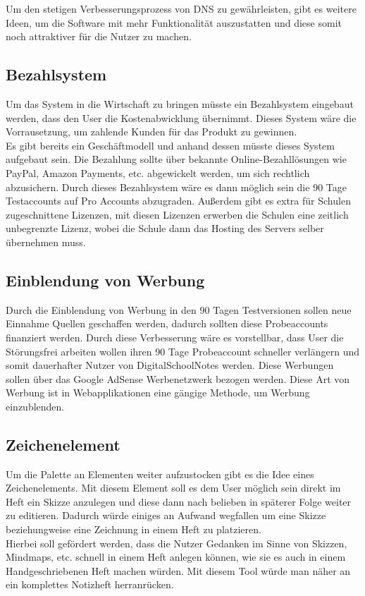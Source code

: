 Um den stetigen Verbesserungsprozess von DNS zu gewährleisten, gibt es weitere Ideen, um die Software mit mehr Funktionalität auszustatten und diese somit noch attraktiver für die Nutzer zu machen. 
\subsection{Bezahlsystem}
Um das System in die Wirtschaft zu bringen müsste ein Bezahlsystem eingebaut werden, dass den User die Kostenabwicklung übernimmt. Dieses System wäre die Vorrausetzung, um zahlende Kunden für das Produkt zu gewinnen.\\
Es gibt bereits ein Geschäftmodell und anhand dessen müsste dieses System aufgebaut sein. 
Die Bezahlung sollte über bekannte Online-Bezahllösungen wie PayPal, Amazon Payments, etc. abgewickelt werden, um sich rechtlich abzusichern. Durch dieses Bezahlsystem wäre es dann möglich sein die 90 Tage Testaccounts auf Pro Accounts abzugraden. Außerdem gibt es extra für Schulen zugeschnittene Lizenzen, mit diesen Lizenzen erwerben die Schulen eine zeitlich unbegrenzte Lizenz, wobei die Schule dann das Hosting des Servers selber übernehmen muss. 
\subsection{Einblendung von Werbung}
Durch die Einblendung von Werbung in den 90 Tagen Testversionen sollen neue Einnahme Quellen geschaffen werden, dadurch sollten diese Probeaccounts finanziert werden. Durch diese Verbesserung wäre es vorstellbar, dass User die Störungsfrei arbeiten wollen ihren 90 Tage Probeaccount schneller verlängern und somit dauerhafter Nutzer von DigitalSchoolNotes werden. Diese Werbungen sollen über das Google AdSense Werbenetzwerk bezogen werden. Diese Art von Werbung ist in Webapplikationen eine gängige Methode, um Werbung einzublenden.
\subsection{Zeichenelement}
Um die Palette an Elementen weiter aufzustocken gibt es die Idee eines Zeichenelements. Mit diesem Element soll es dem User möglich sein direkt im Heft ein Skizze anzulegen und diese dann nach belieben in späterer Folge weiter zu editieren. Dadurch würde einiges an Aufwand wegfallen um eine Skizze beziehungweise eine Zeichnung in einem Heft zu platzieren.\\
Hierbei soll gefördert werden, dass die Nutzer Gedanken im Sinne von Skizzen, Mindmaps, etc. schnell in einem Heft anlegen können, wie sie es auch in einem Handgeschriebenen Heft machen würden. Mit diesem Tool würde man näher an ein komplettes Notizheft herranrücken. 
